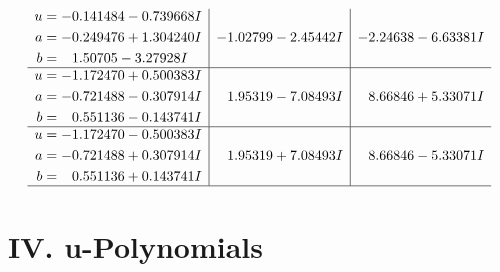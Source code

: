 \documentclass[1p]{elsarticle_modified}
\theoremstyle{definition}
\begin{document}
$$\begin{array}{c|c|c}
\begin{aligned}
u &= -0.141484 - 0.739668 I \\
a &= -0.249476 + 1.304240 I \\
b &= \phantom{-}1.50705 - 3.27928 I\end{aligned}
 & -1.02799 - 2.45442 I & -2.24638 - 6.63381 I \\ \hline\begin{aligned}
u &= -1.172470 + 0.500383 I \\
a &= -0.721488 - 0.307914 I \\
b &= \phantom{-}0.551136 - 0.143741 I\end{aligned}
 & \phantom{-}1.95319 - 7.08493 I & \phantom{-}8.66846 + 5.33071 I \\ \hline\begin{aligned}
u &= -1.172470 - 0.500383 I \\
a &= -0.721488 + 0.307914 I \\
b &= \phantom{-}0.551136 + 0.143741 I\end{aligned}
 & \phantom{-}1.95319 + 7.08493 I & \phantom{-}8.66846 - 5.33071 I\\
 \hline 
 \end{array}$$\newpage
\newpage\renewcommand{\arraystretch}{1}
\centering \section*{ IV. u-Polynomials}
\end{document}
